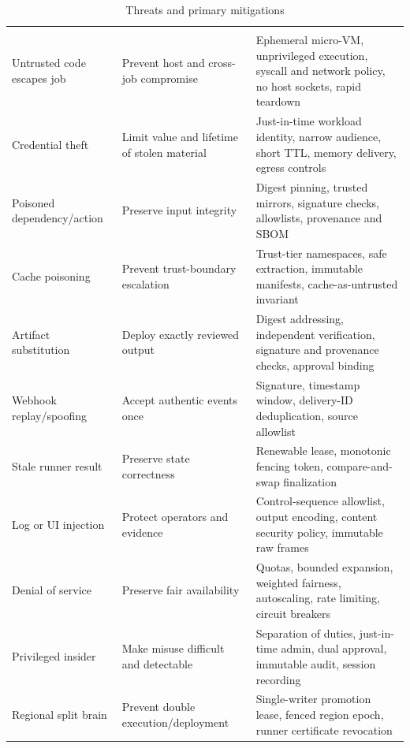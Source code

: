 \begin{longtable}{@{}L{0.24\textwidth}L{0.31\textwidth}L{0.37\textwidth}@{}}
\caption{Threats and primary mitigations}\label{tab:threats}\\
\toprule
{} &  &  \\
\midrule
\endfirsthead
\toprule
{} &  &  \\
\midrule
\endhead
Untrusted code escapes job & Prevent host and cross-job compromise & Ephemeral micro-VM, unprivileged execution, syscall and network policy, no host sockets, rapid teardown \\
Credential theft & Limit value and lifetime of stolen material & Just-in-time workload identity, narrow audience, short TTL, memory delivery, egress controls \\
Poisoned dependency/action & Preserve input integrity & Digest pinning, trusted mirrors, signature checks, allowlists, provenance and SBOM \\
Cache poisoning & Prevent trust-boundary escalation & Trust-tier namespaces, safe extraction, immutable manifests, cache-as-untrusted invariant \\
Artifact substitution & Deploy exactly reviewed output & Digest addressing, independent verification, signature and provenance checks, approval binding \\
Webhook replay/spoofing & Accept authentic events once & Signature, timestamp window, delivery-ID deduplication, source allowlist \\
Stale runner result & Preserve state correctness & Renewable lease, monotonic fencing token, compare-and-swap finalization \\
Log or UI injection & Protect operators and evidence & Control-sequence allowlist, output encoding, content security policy, immutable raw frames \\
Denial of service & Preserve fair availability & Quotas, bounded expansion, weighted fairness, autoscaling, rate limiting, circuit breakers \\
Privileged insider & Make misuse difficult and detectable & Separation of duties, just-in-time admin, dual approval, immutable audit, session recording \\
Regional split brain & Prevent double execution/deployment & Single-writer promotion lease, fenced region epoch, runner certificate revocation \\
\bottomrule
\end{longtable}

